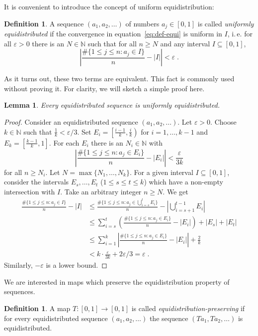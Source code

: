 \documentclass{amsart}
\newtheorem{lemma}[theorem]{Lemma}
\theoremstyle{definition}
\newtheorem{definition}[theorem]{Definition}
\theoremstyle{remark}
\begin{document}
It is convenient to introduce the concept of uniform equidistribution:
\begin{definition}\label{def:uniequi}
A sequence $(a_1,a_2,\dots)$ of numbers $a_j\in[0,1]$ is called \emph{uniformly equidistributed} if the convergence in equation~\eqref{eq:def-equi} is uniform in $I$, i.\,e. for all $\varepsilon>0$ there is an $N\in{\ensuremath{\mathbb N}}$ such that for all
$n\ge N$ and any interval $I\subseteq[0,1]$,
\[ \left|\frac{\#\{1\le j\le n:a_j\in I\}}n - |I|\right| < \varepsilon \;. \]
\end{definition}
As it turns out, these two terms are equivalent.
This fact is commonly used without proving it. For clarity, we will sketch a simple proof here.
\begin{lemma}\label{lem:uniequi-equi}
Every equidistributed sequence is uniformly equidistributed.
\end{lemma}
\begin{proof}
Consider an equidistributed sequence $(a_1,a_2,\dots)$. Let $\varepsilon>0$.
Choose $k\in{\ensuremath{\mathbb N}}$ such that $\frac1k<\varepsilon/3$. Set $E_i=\left[\frac{i-1}k,\frac ik\right)$ for $i=1,\dots,k-1$ and $E_k=\left[\frac{k-1}k,1\right]$.
For each $E_i$ there is an $N_i\in{\ensuremath{\mathbb N}}$ with
\[ \left|\frac{\#\{1\le j\le n:a_j\in E_i\}}n - |E_i|\right| < \frac\varepsilon{3k} \]
for all $n\ge N_i$. Let $N=\max\{N_1,\dots,N_k\}$. For a given interval $I\subseteq[0,1]$,
consider the intervals $E_s,\dots,E_t$ ($1\le s\le t\le k$) which have a
non-empty intersection with $I$. Take an arbitrary integer $n\ge N$. We get
\begin{align*}
\frac{\#\{1\le j\le n:a_j\in I\}}n-|I| &\le \frac{\#\{1\le j\le n:a_j\in\bigcup_{i=s}^t E_i\}}n - \left|\bigcup_{i=s+1}^{t-1}E_i\right| \\
&\le \sum_{i=s}^t\left(\frac{\#\{1\le j\le n:a_j\in E_i\}}n-|E_i|\right)+|E_s|+|E_t| \\
&\le \sum_{i=1}^k\left|\frac{\#\{1\le j\le n:a_j\in E_i\}}n-|E_i|\right|+\frac2k \\
&< k\cdot\frac\varepsilon{3k}+2\varepsilon/3 = \varepsilon \;.
\end{align*}
Similarly, $-\varepsilon$ is a lower bound.
\end{proof}
We are interested in maps which preserve the equidistribution property of sequences.
\begin{definition}\label{def:equipres}
A map $T\colon[0,1]\to[0,1]$ is called \emph{equidistribution-preserving} if for every
equidistributed sequence $(a_1,a_2,\dots)$ the sequence $(Ta_1,Ta_2,\dots)$ is equidistributed.
\end{definition}
\end{document}
